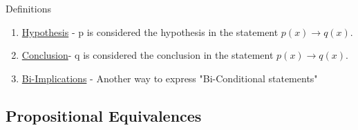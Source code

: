 \documentclass[12pt]{article}
\begin{document}
Definitions
\begin{enumerate}
\item \underline{Hypothesis} - p is considered the hypothesis in the statement $p(x) \rightarrow q(x)$.
\item \underline{Conclusion}- q is considered the conclusion in the statement $p(x) \rightarrow q(x)$.
\item \underline{Bi-Implications} - Another way to express "Bi-Conditional statements"
\end{enumerate}

\quad

\quad

\subsection{Propositional Equivalences}
\end{document}
